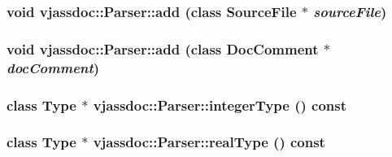 \hypertarget{classvjassdoc_1_1Parser_51c198043bbaf99de2dff41743ad52f5}{
\subsubsection{\setlength{\rightskip}{0pt plus 5cm}void vjassdoc::Parser::add (class {\bf SourceFile} $\ast$ {\em sourceFile})}}
\label{classvjassdoc_1_1Parser_51c198043bbaf99de2dff41743ad52f5}


\hypertarget{classvjassdoc_1_1Parser_2bb67835019bcb11b1a8cddf6c123a29}{
\subsubsection{\setlength{\rightskip}{0pt plus 5cm}void vjassdoc::Parser::add (class {\bf DocComment} $\ast$ {\em docComment})}}
\label{classvjassdoc_1_1Parser_2bb67835019bcb11b1a8cddf6c123a29}


\hypertarget{classvjassdoc_1_1Parser_b1626fc6672aa818b981e0e4ffc3cd47}{
\subsubsection{\setlength{\rightskip}{0pt plus 5cm}class {\bf Type} $\ast$ vjassdoc::Parser::integerType () const}}
\label{classvjassdoc_1_1Parser_b1626fc6672aa818b981e0e4ffc3cd47}


\hypertarget{classvjassdoc_1_1Parser_62b691d7ba04b663d6044ede61f4d2dd}{
\subsubsection{\setlength{\rightskip}{0pt plus 5cm}class {\bf Type} $\ast$ vjassdoc::Parser::realType () const}}
\label{classvjassdoc_1_1Parser_62b691d7ba04b663d6044ede61f4d2dd}


